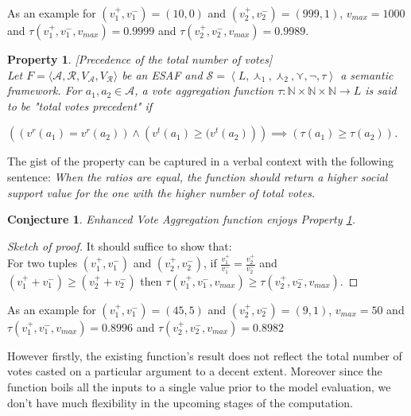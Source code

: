 \documentclass{article}
\newtheorem{property}{Property}
\newtheorem{conjecture}{Conjecture}
\newcommand{\nat}{\mathbb{N}}   %
\newcommand{\args}{\mathcal{A}} %
\newcommand{\att}{\mathcal{R}}  %
\newcommand{\valueset}{L}
\newcommand{\varg}{V_{\args}}   %
\newcommand{\vatt}{V_{\att}}   %
\newcommand{\safid}{F}               %
\newcommand{\saf}{\safid = \safbody} %
\newcommand{\safbody}{\langle \args, \att, \varg, \vatt \rangle} %
\newcommand{\semid}{\mathcal{S}}        %
\newcommand{\sembody}{\left\langle \valueset,\SAFand_1, \SAFand_2,\SAFor,\lnot,\tau \right\rangle}
\newcommand{\semdef}{\semid = \sembody}     %
\newcommand{\SAFand}{\curlywedge}     %
\newcommand{\SAFor}{\curlyvee}        %
\begin{document}
As an example for  $(v^+_1, v^-_1) = (10,0)$ and $(v^+_2, v^-_2) = (999,1)$, $v_{max} = 1000$ and $\tau(v^+_1, v^-_1, v_{max}) = 0.9999$ and  $\tau(v^+_2, v^-_2, v_{max}) = 0.9989$.

{\color{red}
\begin{property}
\label{P3}[Precedence of the total number of votes] \\
Let $\saf$ be an ESAF and $\semdef$ a semantic framework.  For $a_1, a_2 \in \args$, a vote aggregation function $\tau : \nat \times \nat \times \nat \to L$ is said to be "total votes precedent" if
\begin{center}
 $\left( \left(v^{r}(a_{1}) = v^{r}(a_{2}) \right) \land  \left( v^{t}(a_{1}) \ge ( v^{t}(a_{2}) \right) \right) \implies \left( \tau(a_1) \ge \tau(a_2) \right)$. 
\end{center}
\end{property}
}

The gist of the property can be captured in a verbal context with the following sentence: \emph{When the ratios are equal, the function should return a higher social support value for the one with the higher number of total votes.}  \\

\begin{conjecture}
Enhanced Vote Aggregation function enjoys Property \ref{P3}.
\end{conjecture}

\begin{proof}  [Sketch of proof] It should suffice to show that:
\\
 For two tuples $(v^+_1, v^-_1)$ and $(v^+_2, v^-_2)$, if $\frac{v^+_1} {v^-_1} = \frac{v^+_2} {v^-_2}$ and $( v^+_1 + v^-_1) \ge ( v^+_2 + v^-_2)$ then $\tau(v^+_1, v^-_1, v_{max}) \ge \tau(v^+_2, v^-_2, v_{max})$.
\end{proof}


As an example for $(v^+_1, v^-_1) = (45,5)$ and $(v^+_2, v^-_2) = (9,1)$, $v_{max} = 50$ and $\tau(v^+_1, v^-_1, v_{max}) = 0.8996$ and  $\tau(v^+_2, v^-_2, v_{max}) = 0.8982$




\vspace{10 mm}

However firstly, the existing function's result does not reflect the total number of votes casted on a particular argument to a decent extent. Moreover since the function boils all the inputs to a single value prior to the model evaluation, we don't have much flexibility in the upcoming stages of the computation.
\end{document}
